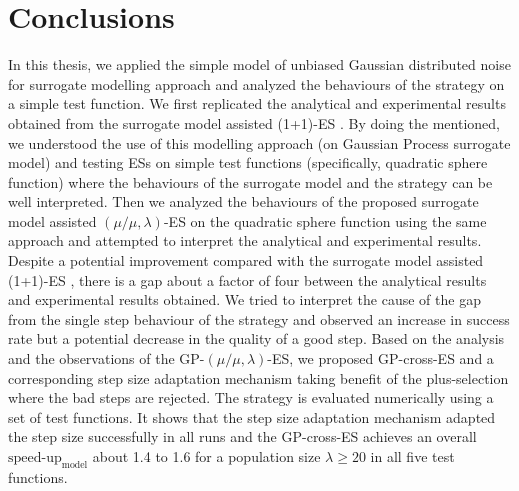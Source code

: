 









\section{Conclusions}
In this thesis, we applied the simple model \cite{DBLP:conf/ppsn/KayhaniA18} of unbiased Gaussian distributed noise for surrogate modelling approach and analyzed the behaviours of the strategy on a simple test function. We first replicated the analytical and experimental results obtained from the surrogate model assisted (1+1)-ES \cite{DBLP:conf/ppsn/KayhaniA18}. By doing the mentioned, we understood the use of this modelling approach (on Gaussian Process surrogate model) and testing ESs on simple test functions (specifically, quadratic sphere function) where the behaviours of the surrogate model and the strategy can be well interpreted. Then we analyzed the behaviours of the proposed surrogate model assisted $(\mu/\mu,\lambda)$-ES on the quadratic sphere function using the same approach and attempted to interpret the analytical and experimental results. Despite a potential improvement compared with the surrogate model assisted (1+1)-ES \cite{DBLP:conf/ppsn/KayhaniA18}, there is a gap about a factor of four between the analytical results and experimental results obtained. We tried to interpret the cause of the gap from the single step behaviour of the strategy and observed an increase in success rate but a potential decrease in the quality of a good step. Based on the analysis and the observations of the GP-$(\mu/\mu,\lambda)$-ES, we proposed GP-cross-ES and a corresponding step size adaptation mechanism taking benefit of the plus-selection where the bad steps are rejected. The strategy is evaluated numerically using a set of test functions. It shows that the step size adaptation mechanism adapted the step size successfully in all runs and the GP-cross-ES achieves an overall $\text{speed-up}_{\text{model}}$ about 1.4 to 1.6 for a population size $\lambda \geq 20$ in all five test functions.

